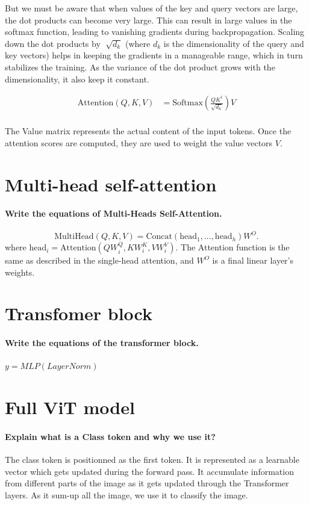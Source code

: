 But we must be aware that when values of the key and query vectors are large, the dot products can become very large. This can result in large values in the softmax function, leading to vanishing gradients during backpropagation. Scaling down the dot products by $ \sqrt[]{d_k} $ (where $ d_k $  is the dimensionality of the query and key vectors) helps in keeping the gradients in a manageable range, which in turn stabilizes the training. As the variance of the dot product grows with the dimensionality, it also keep it constant.

\begin{align*}
    \text{Attention}(Q, K, V) &= \text{Softmax}\left(\frac{QK^t}{\sqrt{d_k}}\right)V \\
\end{align*}

The Value matrix represents the actual content of the input tokens. Once the attention scores are computed, they are used to weight the value vectors $ V $.

\section{Multi-head self-attention}

\paragraph{Write the equations of Multi-Heads Self-Attention.}
\[
    \text{MultiHead}(Q, K, V) = \text{Concat}(\text{head}_1, ..., \text{head}_h)W^O
.\]
where $\text{head}_i = \text{Attention}(QW_i^Q, KW_i^K, VW_i^V)$. The Attention function is the same as described in the single-head attention, and $W^O$ is a final linear layer's weights.

\section{Transfomer block}

\paragraph{Write the equations of the transformer block.}
$y = MLP(LayerNorm)$

\section{Full ViT model}

\paragraph{Explain what is a Class token and why we use it?}
The class token is positionned as the first token. It is represented as a learnable vector which gets updated during the forward pass. It accumulate information from different parts of the image as it gets updated through the Transformer layers. As it sum-up all the image, we use it to classify the image.

